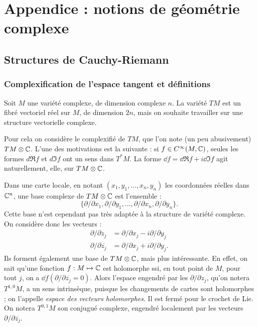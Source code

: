 \chapter{Appendice : notions de géométrie complexe}
\section{Structures de Cauchy-Riemann}
\subsection{Complexification de l'espace tangent et définitions}
Soit $M$ une variété complexe, de dimension complexe $n$. La variété $TM$ est un fibré vectoriel réel sur $M$, de dimension $2n$, mais on souhaite travailler sur une structure vectorielle complexe.

Pour cela on considère le complexifié de $TM$, que l'on note (un peu abusivement) $TM \otimes \mathbb{C}$. L'une des motivations est la suivante : si $f \in C^{\infty}(M,\mathbb{C})$, seules les formes $d\Re f$ et $d\Im f$ ont un sens dans $T^*M$. La forme $\dd f = \dd \Re f + i \dd \Im f$ agit naturellement, elle, sur $TM \otimes \mathbb{C}$.

Dans une carte locale, en notant $(x_1,y_1,\ldots, x_n,y_n)$ les coordonnées réelles dans $\mathbb{C}^n$, une base complexe de $TM \otimes \mathbb{C}$ est l'ensemble :
\begin{equation*}
	\{\partial/\partial x_1,\partial/\partial y_1, \ldots, \partial/\partial x_n, \partial/\partial y_n \}.
\end{equation*}
Cette base n'est cependant pas très adaptée à la structure de variété complexe. On considère donc les vecteurs :
\begin{align*}
	\partial/\partial z_j &= \partial/\partial x_j - i \partial/\partial y_j\\
	\partial/\partial \overline{z_j} &= \partial/\partial x_j + i \partial/\partial y_j.
\end{align*}
Ils forment également une base de $TM \otimes \mathbb{C}$, mais plus intéressante. En effet, on sait qu'une fonction $f : M \mapsto \mathbb{C}$ est holomorphe ssi, en tout point de $M$, pour tout $j$, on a $\dd f(\partial/\partial \overline{z_j}=0)$. Alors l'espace engendré par les $\partial/\partial z_j$, qu'on notera $T^{1,0}M$, a un sens intrinsèque, puisque les changements de cartes sont holomorphes ; on l'appelle \emph{espace des vecteurs holomorphes}. Il est fermé pour le crochet de Lie. On notera $T^{0,1}M$ son conjugué complexe, engendré localement par les vecteurs $\partial/\partial \overline{z_j}$.

